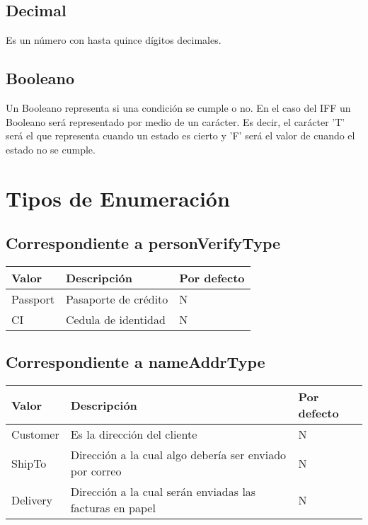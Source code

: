\subsection{Decimal}
Es un número con hasta quince dígitos decimales.

\subsection{Booleano}
Un Booleano representa si una condición se cumple o no. En el caso del IFF un Booleano será representado por medio de un carácter. Es decir, el carácter 'T' será el que representa cuando un estado es cierto y 'F' será el valor de cuando el estado no se cumple.

\section{Tipos de Enumeración}
\subsection{Correspondiente a personVerifyType}
\begin{center}
\begin{tabular}{|>{\centering\arraybackslash}p{}|>{\centering\arraybackslash}p{}|>{\centering\arraybackslash}p{}|}
\hline 
\bfseries {Valor} & \bfseries {Descripción} & \bfseries {Por defecto} \\ 
\hline 
Passport & Pasaporte de crédito & N \\ 
\hline 
CI & Cedula de identidad & N \\
\hline 
\end{tabular} 
\end{center}

\subsection{Correspondiente a nameAddrType}
\begin{center}
\begin{tabular}{|>{\centering\arraybackslash}p{}|>{\centering\arraybackslash}p{}|>{\centering\arraybackslash}p{}|}
\hline 
\bfseries {Valor} & \bfseries {Descripción} & \bfseries {Por defecto} \\ 
\hline 
Customer & Es la dirección del cliente & N \\ 
\hline 
ShipTo & Dirección a la cual algo debería ser enviado por correo & N \\
\hline 
Delivery & Dirección a la cual serán enviadas las facturas en papel & N \\
\hline 
\end{tabular} 
\end{center}

